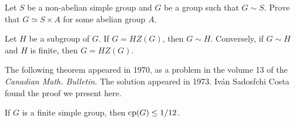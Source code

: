 \begin{exercise}
\label{xca:isoclinism_simple}
    Let $S$ be a non-abelian simple group and
    $G$ be a group such that $G\sim S$. Prove that 
    $G\simeq S\times A$ for some abelian group $A$.
\end{exercise}

\begin{exercise}
\label{xca:isoclinism_factorization}
    Let $H$ be a subgroup of $G$. If $G=HZ(G)$, then $G\sim H$. 
    Conversely, if $G\sim H$ and $H$ is finite, then 
    $G=HZ(G)$. 
\end{exercise}

\begin{exercise}
    
\end{exercise}

The following theorem appeared in 1970, as a problem in the 
volume 13 of the \emph{Canadian Math. Bulletin}. The solution
appeared in 1973. 
Iv\'an Sadosfchi Costa found the proof we present here. 

\begin{theorem}[Dixon]
    If $G$ is a finite simple group, then $\operatorname{cp}(G)\leq1/12$.
\end{theorem}

